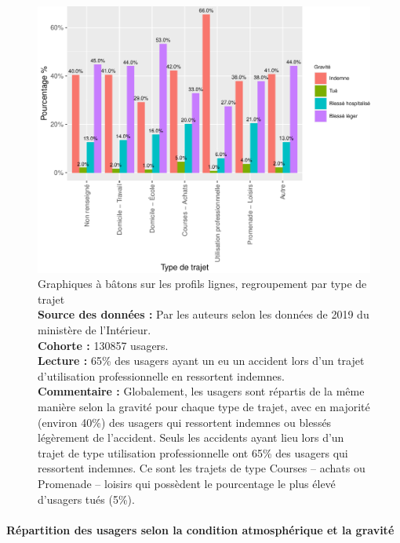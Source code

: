 \documentclass[french,]{tp}
\let\oldparagraph\paragraph
\renewcommand{\paragraph}[1]{\oldparagraph{#1}\mbox{}}
\begin{document}
\begin{figure}[ht!]

{\centering \includegraphics{Prediction_Gravite_files/figure-latex/barplottrajet-1} 

}

\caption{Graphiques à bâtons sur les profils lignes, regroupement par type de trajet\\
\textbf{Source des données :} Par les auteurs selon les données de 2019 du ministère de l'Intérieur.\\
\textbf{Cohorte :} 130857 usagers.\\
\textbf{Lecture :} 65\% des usagers ayant un eu un accident lors d'un trajet d'utilisation professionnelle en ressortent indemnes.\\
\textbf{Commentaire :} Globalement, les usagers sont répartis de la même manière selon la gravité pour chaque type de trajet, avec en majorité (environ 40\%) des usagers qui ressortent indemnes ou blessés légèrement de l'accident. Seuls les accidents ayant lieu lors d'un trajet de type utilisation professionnelle ont 65\% des usagers qui ressortent indemnes. Ce sont les trajets de type Courses -- achats ou Promenade -- loisirs qui possèdent le pourcentage le plus élevé d'usagers tués (5\%).}\label{fig:barplottrajet}
\end{figure}

\newpage

\hypertarget{ruxe9partition-des-usagers-selon-la-condition-atmosphuxe9rique-et-la-gravituxe9}{%
\paragraph{Répartition des usagers selon la condition atmosphérique et la gravité}\label{ruxe9partition-des-usagers-selon-la-condition-atmosphuxe9rique-et-la-gravituxe9}}
\end{document}

